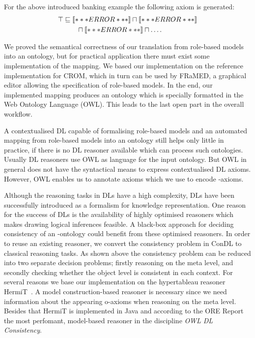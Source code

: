 \documentclass[final]{scrartcl}
\begin{document}
For the above introduced banking example the following axiom is generated:
\begin{align}
  \begin{split}
    \top & \sqsubseteq \oax{\exists\plays.\mathsf{Consultant} \sqsubseteq 
      (\mathsf{Person})} \sqcap \oax{\exists\plays.\mathsf{Customer} \sqsubseteq
      (\mathsf{Person}\sqcup\mathsf{Company})} \\
    & \qquad \sqcap\oax{\exists\plays.\mathsf{SavingsAccount}\sqsubseteq\mathsf{Account}} \sqcap \dots.
  \end{split} \label{eq:fills2}
\end{align}

We proved the semantical correctness of our translation from role-based models into an \LMLO
ontology, but for practical application there must exist some implementation of the mapping. We
based our implementation on the reference implementation for CROM, which in turn can be used by
FRaMED, a graphical editor allowing the specification of role-based models. In the end, our
implemented mapping produces an ontology which is specially formatted in the Web Ontology Language
(OWL).  This leads to the last open part in the overall workflow.

A contextualised DL capable of formalising role-based models and an automated mapping from
role-based models into an ontology still helps only little in practice, if there is no DL
reasoner available which can process such ontologies.
%
Usually DL reasoners use OWL as language for the input ontology. But OWL in general does not
have the syntactical means to express contextualised DL axioms. However, OWL enables us to annotate
axioms which we use to encode \LMLO-axioms.



Although the reasoning tasks in DLs have a high complexity, DLs have been successfully introduced as
a formalism for knowledge representation. One reason for the success of DLs is the availability of
highly optimised reasoners which makes drawing logical inferences feasible. A black-box approach for
deciding consistency of an \LMLO-ontology could benefit from these optimised reasoners. In order to
reuse an existing reasoner, we convert the consistency problem in ConDL to classical reasoning
tasks.
%
As shown above the consistency problem can be reduced into two separate decision
problems; firstly reasoning on the meta level, and secondly checking whether the object level is
consistent in each context.
%
For several reasons we base our implementation on the hypertableau reasoner
HermiT~\cite{MoSH-JAIR09,GHM-JAR14}. A model construction-based reasoner is necessary since we need
information about the appearing o-axioms when reasoning on the meta level. Besides that HermiT
is implemented in Java and according to the ORE Report~\cite{PaMGGS-SSWS15} the most perfomant,
model-based reasoner in the discipline \emph{OWL DL Consistency}.
\end{document}
